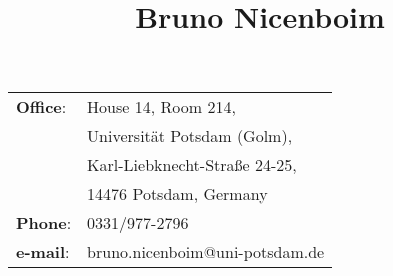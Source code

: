 \documentclass[a4paper,11pt]{article}
\title{\bfseries\Huge Bruno Nicenboim}
\author{}
\date{}
\newcommand\VRule{\color{lightgray}\vrule width 0.5pt}
\begin{document}
\maketitle
\vspace{1em}
\begin{minipage}[ht]{0.5\textwidth}
\begin{tabular}{ll}
{\textbf{Office}:}&House 14, Room 214,\\
& Universität Potsdam (Golm),\\
& Karl-Liebknecht-Straße 24-25,\\
& 14476 Potsdam, Germany\\
{\textbf{Phone}:}&{ 0331/977-2796}\\
{\textbf{e-mail}:}&{bruno.nicenboim@uni-potsdam.de}\\
\end{tabular}
\end{minipage}
\begin{minipage}[ht]{0.5\textwidth}
\begin{tabular}{ll}
\end{tabular}
\end{minipage}
\vspace{20pt}
 


 
\end{document}
